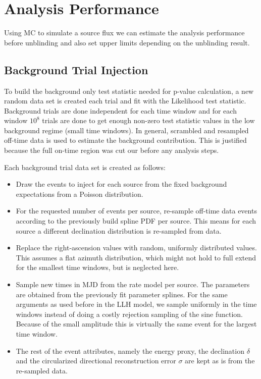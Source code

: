 \section{Analysis Performance}
Using MC to simulate a source flux we can estimate the analysis performance before unblinding and also set upper limits depending on the unblinding result.

\subsection{Background Trial Injection}
To build the background only test statistic needed for p-value calculation, a new random data set is created each trial and fit with the Likelihood test statistic.
Background trials are done independent for each time window and for each window $10^8$ trials are done to get enough non-zero test statistic values in the low background regime (small time windows).
In general, scrambled and resampled off-time data is used to estimate the background contribution.
This is justified because the full on-time region was cut our before any analysis steps.

Each background trial data set is created as follows:
\begin{itemize}
  \item Draw the events to inject for each source from the fixed background expectations from a Poisson distribution.
  \item For the requested number of events per source, re-sample off-time data events according to the previously build spline PDF per source.
  This means for each source a different declination distribution is re-sampled from data.
  \item Replace the right-ascension values with random, uniformly distributed values.
  This assumes a flat azimuth distribution, which might not hold to full extend for the smallest time windows, but is neglected here.
  \item Sample new times in MJD from the rate model per source.
  The parameters are obtained from the previously fit parameter splines.
  For the same arguments as used before in the LLH model, we sample uniformly in the time windows instead of doing a costly rejection sampling of the sine function.
  Because of the small amplitude this is virtually the same event for the largest time window.
  \item The rest of the event attributes, namely the energy proxy, the declination $\delta$ and the circularized directional reconstruction error $\sigma$ are kept as is from the re-sampled data.
\end{itemize}

